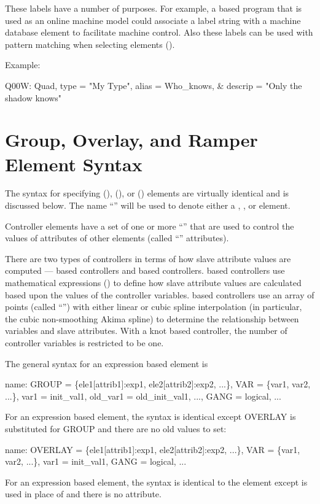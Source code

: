 These labels have a number of purposes. For example, a \bmad based program that is used as an online
machine model could associate a label string with a machine database element to facilitate machine
control. Also these labels can be used with pattern matching when selecting elements ().

Example:
\begin{example}
  Q00W: Quad, type = "My Type", alias = Who_knows, &
                                  descrip = "Only the shadow knows"
\end{example}

\section{Group, Overlay, and Ramper Element Syntax}
\label{s:go.syntax}

The syntax for specifying  (),  (), or
 () elements
are virtually identical and is discussed below. The name ``'' will be used to denote
either a , , or  element.

Controller elements have a set of one or more ``'' that are used to control the values
of attributes of other elements (called ``'' attributes).

There are two types of controllers in terms of how slave attribute values are computed ---
 based controllers and  based controllers.  based controllers
use mathematical expressions () to define how slave attribute values are calculated
based upon the values of the controller variables.  based controllers use an array of
points (called ``'') with either linear or cubic spline interpolation (in particular, the
cubic non-smoothing Akima spline\cite{b:akima}) to determine the relationship between variables and
slave attributes. With a knot based controller, the number of controller variables is restricted
to be one.

The general syntax for an expression based  element is
\begin{example}
  name: GROUP = \{ele1[attrib1]:exp1, ele2[attrib2]:exp2, ...\}, 
          VAR = \{var1, var2, ...\}, var1 = init_val1, 
          old_var1 = old_init_val1, ..., GANG = logical, ...
\end{example}
For an expression based  element, the syntax is identical except OVERLAY is
substituted for GROUP and there are no old values to set:
\begin{example}
  name: OVERLAY = \{ele1[attrib1]:exp1, ele2[attrib2]:exp2, ...\}, 
          VAR = \{var1, var2, ...\}, var1 = init_val1, GANG = logical, ...
\end{example}
For an expression based  element, the syntax is identical to the  element
except  is used in place of  and there is no  attribute.


